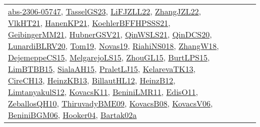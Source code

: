 {\begin{longtable}{lp{3cm}>{\raggedright}p{6cm}>{\raggedright}p{6cm}p{8cm}}
\href{articles/abs-2306-05747.pdf}{abs-2306-05747}\cite{abs-2306-05747}, \href{papers/TasselGS23.pdf}{TasselGS23}\cite{TasselGS23}, \href{papers/LiFJZLL22.pdf}{LiFJZLL22}\cite{LiFJZLL22}, \href{papers/ZhangJZL22.pdf}{ZhangJZL22}\cite{ZhangJZL22}, \href{articles/VlkHT21.pdf}{VlkHT21}\cite{VlkHT21}, \href{papers/HanenKP21.pdf}{HanenKP21}\cite{HanenKP21}, \href{articles/KoehlerBFFHPSSS21.pdf}{KoehlerBFFHPSSS21}\cite{KoehlerBFFHPSSS21}, \href{papers/GeibingerMM21.pdf}{GeibingerMM21}\cite{GeibingerMM21}, \href{articles/HubnerGSV21.pdf}{HubnerGSV21}\cite{HubnerGSV21}, \href{articles/QinWSLS21.pdf}{QinWSLS21}\cite{QinWSLS21}, \href{articles/QinDCS20.pdf}{QinDCS20}\cite{QinDCS20}, \href{articles/LunardiBLRV20.pdf}{LunardiBLRV20}\cite{LunardiBLRV20}, \href{papers/Tom19.pdf}{Tom19}\cite{Tom19}, \href{articles/Novas19.pdf}{Novas19}\cite{Novas19}, \href{papers/RiahiNS018.pdf}{RiahiNS018}\cite{RiahiNS018}, \href{articles/ZhangW18.pdf}{ZhangW18}\cite{ZhangW18}, \href{papers/DejemeppeCS15.pdf}{DejemeppeCS15}\cite{DejemeppeCS15}, \href{papers/MelgarejoLS15.pdf}{MelgarejoLS15}\cite{MelgarejoLS15}, \href{papers/ZhouGL15.pdf}{ZhouGL15}\cite{ZhouGL15}, \href{papers/BurtLPS15.pdf}{BurtLPS15}\cite{BurtLPS15}, \href{papers/LimBTBB15.pdf}{LimBTBB15}\cite{LimBTBB15}, \href{papers/SialaAH15.pdf}{SialaAH15}\cite{SialaAH15}, \href{papers/PraletLJ15.pdf}{PraletLJ15}\cite{PraletLJ15}, \href{papers/KelarevaTK13.pdf}{KelarevaTK13}\cite{KelarevaTK13}, \href{papers/CireCH13.pdf}{CireCH13}\cite{CireCH13}, \href{papers/HeinzKB13.pdf}{HeinzKB13}\cite{HeinzKB13}, \href{papers/BillautHL12.pdf}{BillautHL12}\cite{BillautHL12}, \href{papers/HeinzB12.pdf}{HeinzB12}\cite{HeinzB12}, \href{articles/LimtanyakulS12.pdf}{LimtanyakulS12}\cite{LimtanyakulS12}, \href{articles/KovacsK11.pdf}{KovacsK11}\cite{KovacsK11}, \href{articles/BeniniLMR11.pdf}{BeniniLMR11}\cite{BeniniLMR11}, \href{papers/EdisO11.pdf}{EdisO11}\cite{EdisO11}, \href{articles/ZeballosQH10.pdf}{ZeballosQH10}\cite{ZeballosQH10}, \href{papers/ThiruvadyBME09.pdf}{ThiruvadyBME09}\cite{ThiruvadyBME09}, \href{articles/KovacsB08.pdf}{KovacsB08}\cite{KovacsB08}, \href{papers/KovacsV06.pdf}{KovacsV06}\cite{KovacsV06}, \href{papers/BeniniBGM06.pdf}{BeniniBGM06}\cite{BeniniBGM06}, \href{papers/Hooker04.pdf}{Hooker04}\cite{Hooker04}, \href{papers/Bartak02a.pdf}{Bartak02a}\cite{Bartak02a}\\

\end{longtable}}
